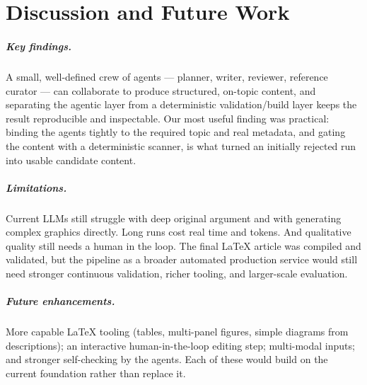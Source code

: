 
\chapter{Discussion and Future Work}

\paragraph{Key findings.} A small, well-defined crew of agents --- planner,
writer, reviewer, reference curator --- can collaborate to produce
structured, on-topic content, and separating the agentic layer from a
deterministic validation/build layer keeps the result reproducible and
inspectable. Our most useful finding was practical: binding the agents
tightly to the required topic and real metadata, and gating the content with
a deterministic scanner, is what turned an initially rejected run into usable
candidate content.

\paragraph{Limitations.} Current LLMs still struggle with deep original
argument and with generating complex graphics directly. Long runs cost real
time and tokens. And qualitative quality still needs a human in the loop. The
final \LaTeX{} article was compiled and validated, but the pipeline as a
broader automated production service would still need stronger continuous
validation, richer tooling, and larger-scale evaluation.

\paragraph{Future enhancements.} More capable \LaTeX{} tooling (tables,
multi-panel figures, simple diagrams from descriptions); an interactive
human-in-the-loop editing step; multi-modal inputs; and stronger
self-checking by the agents. Each of these would build on the current
foundation rather than replace it.
